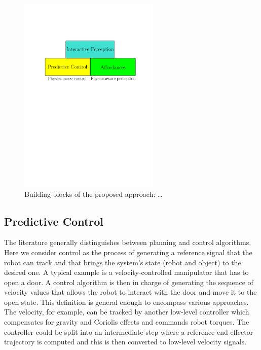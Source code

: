 \begin{figure}[h]
\centering
\includegraphics[width=0.6\textwidth]{images/blocks.pdf}
\caption{Building blocks of the proposed approach: \ldots}
\end{figure}

\subsection{Predictive Control}\label{sec:pred_control}
The literature generally distinguishes between planning and control algorithms. Here we consider control as the process of generating a reference signal that the robot can track and that brings the system's state (robot and object) to the desired one. A typical example is a velocity-controlled manipulator that has to open a door. A control algorithm is then in charge of generating the sequence of velocity values that allows the robot to interact with the door and move it to the open state. This definition is general enough to encompass various approaches. The velocity, for example, can be tracked by another low-level controller which compensates for gravity and Coriolis effects and commands robot torques. The controller could be split into an intermediate step where a reference end-effector trajectory is computed and this is then converted to low-level velocity signals.

